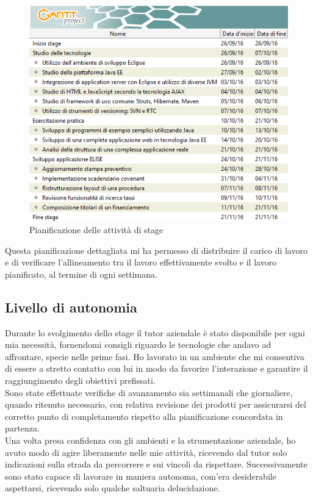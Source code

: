 	\begin{figure}[H]
		\centering
	   	\includegraphics[width=1\textwidth]{immagini/tabella_gantt}
	   	\caption{Pianificazione delle attività di stage}
	\end{figure}
		
	Questa pianificazione dettagliata mi ha permesso di distribuire il carico di lavoro e di verificare l'allineamento tra il lavoro effettivamente svolto e il lavoro pianificato, al termine di ogni settimana.	
	
	\subsection{Livello di autonomia}
	
	Durante lo svolgimento dello stage il tutor aziendale è stato disponibile per ogni mia necessità, fornendomi consigli riguardo le tecnologie che andavo ad affrontare, specie nelle	prime fasi. Ho lavorato in un ambiente che mi consentiva di essere a stretto contatto con lui in modo da favorire l'interazione e garantire il raggiungimento degli obiettivi prefissati.\\
	
	Sono state effettuate verifiche di avanzamento sia settimanali che giornaliere, quando ritenuto necessario, con relativa revisione dei prodotti per assicurarsi del corretto punto di completamento rispetto alla pianificazione concordata in partenza.\\
	
	Una volta presa confidenza con gli ambienti e la strumentazione aziendale, ho avuto modo di agire liberamente nelle mie attività, ricevendo dal tutor solo indicazioni sulla strada da percorrere e sui vincoli da rispettare. Successivamente sono stato capace di lavorare in maniera autonoma, com'era desiderabile aspettarsi, ricevendo solo qualche saltuaria delucidazione.	
	
